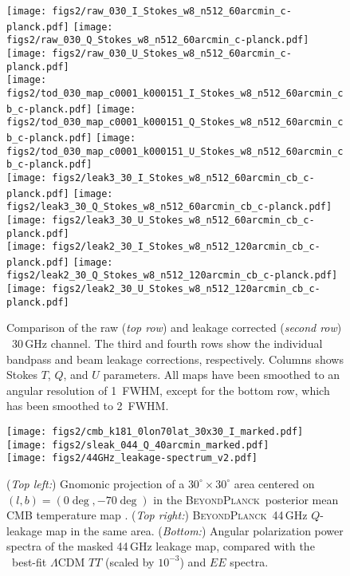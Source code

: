 \documentclass[twocolumn]{aa}
\newcommand{\BP}{\textsc{BeyondPlanck}}
\newcommand{\?}[1]{\textcolor{red}{{\bf [#1]}}}
\begin{document}
\begin{figure*}[t]
    \texttt{[image: figs2/raw\_030\_I\_Stokes\_w8\_n512\_60arcmin\_c-planck.pdf]}
    \texttt{[image: figs2/raw\_030\_Q\_Stokes\_w8\_n512\_60arcmin\_c-planck.pdf]}
    \texttt{[image: figs2/raw\_030\_U\_Stokes\_w8\_n512\_60arcmin\_c-planck.pdf]}\\
    \texttt{[image: figs2/tod\_030\_map\_c0001\_k000151\_I\_Stokes\_w8\_n512\_60arcmin\_cb\_c-planck.pdf]}
    \texttt{[image: figs2/tod\_030\_map\_c0001\_k000151\_Q\_Stokes\_w8\_n512\_60arcmin\_cb\_c-planck.pdf]}
    \texttt{[image: figs2/tod\_030\_map\_c0001\_k000151\_U\_Stokes\_w8\_n512\_60arcmin\_cb\_c-planck.pdf]}\\
    \texttt{[image: figs2/leak3\_30\_I\_Stokes\_w8\_n512\_60arcmin\_cb\_c-planck.pdf]}
    \texttt{[image: figs2/leak3\_30\_Q\_Stokes\_w8\_n512\_60arcmin\_cb\_c-planck.pdf]}
    \texttt{[image: figs2/leak3\_30\_U\_Stokes\_w8\_n512\_60arcmin\_cb\_c-planck.pdf]}\\    
    \texttt{[image: figs2/leak2\_30\_I\_Stokes\_w8\_n512\_120arcmin\_cb\_c-planck.pdf]}
    \texttt{[image: figs2/leak2\_30\_Q\_Stokes\_w8\_n512\_120arcmin\_cb\_c-planck.pdf]}
    \texttt{[image: figs2/leak2\_30\_U\_Stokes\_w8\_n512\_120arcmin\_cb\_c-planck.pdf]}\\
  \caption{Comparison of the raw (\emph{top row}) and leakage corrected 
    (\emph{second row}) \Planck\ 30\,GHz channel. The third and fourth rows show
    the individual bandpass and beam leakage corrections,
    respectively. Columns shows Stokes $T$, $Q$, and $U$ parameters. All maps have been smoothed to an angular resolution of 1\deg\ FWHM, except for the bottom row, which has been smoothed to 2\deg\ FWHM. }\label{fig:subleakmaps_30}
\end{figure*}

\begin{figure}[t] %
  \texttt{[image: figs2/cmb\_k181\_0lon70lat\_30x30\_I\_marked.pdf]}
  \texttt{[image: figs2/sleak\_044\_Q\_40arcmin\_marked.pdf]}\\
  \texttt{[image: figs2/44GHz\_leakage-spectrum\_v2.pdf]}
  \caption{(\emph{Top left:}) Gnomonic projection of a
    $30^\circ\times30^\circ$ area centered on $(l,b)=(0\deg,-70\deg)$
    in the \BP\ posterior mean CMB temperature map
    \citep{bp11}. (\emph{Top right:}) \BP\ 44\,GHz $Q$-leakage map in
    the same area. (\emph{Bottom:}) Angular polarization power spectra
    of the masked 44\,GHz leakage map, compared with the
    \Planck\ best-fit $\Lambda$CDM $TT$ (scaled by $10^{-3}$) and $EE$
    spectra.}\label{fig:beamleakage}
\end{figure}
\end{document}
